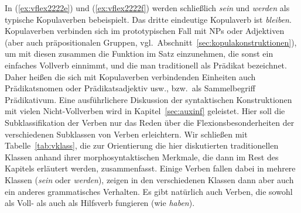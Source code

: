 In (\ref{ex:vflex2222e}) und (\ref{ex:vflex2222f}) werden schließlich \textit{sein} und \textit{werden} als typische Kopulaverben bebeispielt.
Das dritte eindeutige Kopulaverb ist \textit{bleiben}.
Kopulaverben verbinden sich im prototypischen Fall mit NPs oder Adjektiven (aber auch präpositionalen Gruppen, vgl.\ Abschnitt~\ref{sec:kopulakonstruktionen}), um mit diesen zusammen die Funktion im Satz einzunehmen, die sonst ein einfaches Vollverb einnimmt, und die man traditionell als Prädikat bezeichnet.
Daher heißen die sich mit Kopulaverben verbindenden Einheiten auch Prädikatsnomen oder Prädikatsadjektiv usw., bzw.\ als Sammelbegriff Prädikativum.
Eine ausführlichere Diskussion der syntaktischen Konstruktionen mit vielen Nicht-Vollverben wird in Kapitel~\ref{sec:auxinf} geleistet.
Hier soll die Subklassifikation der Verben nur das Reden über die Flexionsbesonderheiten der verschiedenen Subklassen von Verben erleichtern.
Wir schließen mit Tabelle~\ref{tab:vklass}, die zur Orientierung die hier diskutierten traditionellen Klassen anhand ihrer morphosyntaktischen Merkmale, die dann im Rest des Kapitels erläutert werden, zusammenfasst.
Einige Verben fallen dabei in mehrere Klassen (\zB \textit{sein} oder \textit{werden}), zeigen in den verschiedenen Klassen dann aber auch ein anderes grammatisches Verhalten.
Es gibt natürlich auch Verben, die sowohl als Voll- als auch als Hilfsverb fungieren (wie \textit{haben}).

\begin{table}
  \caption{Traditionelle Verbklassen und ihre Eigenschaften}
  \label{tab:vklass}
\end{table}

